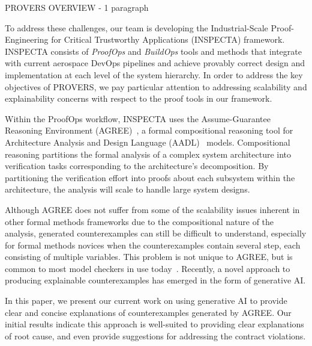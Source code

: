 PROVERS OVERVIEW - 1 paragraph

To address these challenges, our team is developing the Industrial-Scale Proof-Engineering for Critical Trustworthy Applications (INSPECTA) framework.  INSPECTA consists of \textit{ProofOps} and \textit{BuildOps} tools and methods that integrate with current aerospace DevOps pipelines and achieve provably correct design and implementation at each level of the system hierarchy.  In order to address the key objectives of PROVERS, we pay particular attention to addressing scalability and explainability concerns with respect to the proof tools in our framework.

Within the ProofOps workflow, INSPECTA uses the Assume-Guarantee Reasoning Environment (AGREE)~\cite{compositional-analysis-agree}, a formal compositional reasoning tool for Architecture Analysis and Design Language (AADL)~\cite{feiler-aadl} models.
Compositional reasoning partitions the formal analysis of a complex system architecture into verification tasks corresponding to the architecture's decomposition.  By partitioning the verification effort into proofs about each subsystem within the architecture, the analysis will scale to handle large system designs.

Although AGREE does not suffer from some of the scalability issues inherent in other formal methods frameworks due to the compositional nature of the analysis, generated counterexamples can still be difficult to understand, especially for formal methods novices when the counterexamples contain several step, each consisting of multiple variables.  This problem is not unique to AGREE, but is common to most model checkers in use today~\cite{}.  
Recently, a novel approach to producing explainable counterexamples has emerged in the form of generative AI.


In this paper, we present our current work on using generative AI to provide clear and concise explanations of counterexamples generated by AGREE.  Our initial results indicate this approach is well-suited to providing clear explanations of root cause, and even provide suggestions for addressing the contract violations.